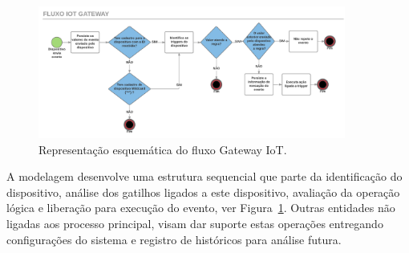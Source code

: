 \begin{figure}[h!]
		\begin{center}
		\includegraphics[width=0.9\textwidth]{./img/fluxograma}
		\caption{Representação esquemática do fluxo Gateway IoT.}
		\label{fig:fluxograma}
	\end{center}
\end{figure}

A modelagem desenvolve uma estrutura sequencial que parte da identificação do dispositivo, análise dos gatilhos ligados a este dispositivo, avaliação da operação lógica e liberação para execução do evento, ver Figura~\ref{fig:fluxograma}. Outras entidades não ligadas aos processo principal, visam dar suporte estas operações entregando configurações do sistema e registro de históricos para análise futura. 
